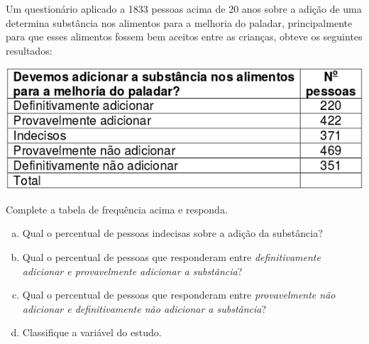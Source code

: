 	\item Um  questionário aplicado  a 1833  pessoas acima  de  20 anos sobre  a adição de uma determina  substância nos alimentos para a melhoria  do paladar,  principalmente para que esses alimentos fossem bem  aceitos entre  as  crianças, obteve  os seguintes resultados: 
	\begin{center}
		\includegraphics[scale=0.7]{figuras/fig121.png}
	\end{center}
	Complete a tabela de frequência acima e responda.
	\begin{enumerate}[a)]
		\item Qual o percentual de pessoas indecisas sobre a adição da  substância?
		\item Qual o percentual de pessoas que responderam entre \textit{definitivamente adicionar e provavelmente adicionar a substância}?
		\item Qual o percentual de pessoas que responderam entre \textit{provavelmente não adicionar e definitivamente não adicionar a substância}?
		\item Classifique a variável do estudo.
	\end{enumerate}
	
